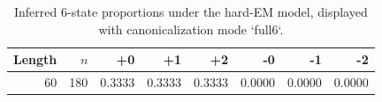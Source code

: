 \begin{table}[t]
\centering
\begin{tabular}{r r r r r r r r}
\hline
Length & $n$ & +0 & +1 & +2 & -0 & -1 & -2 \\
\hline
60 & 180 & 0.3333 & 0.3333 & 0.3333 & 0.0000 & 0.0000 & 0.0000 \\
\hline
\end{tabular}
\caption{Inferred 6-state proportions under the hard-EM model, displayed with canonicalization mode `full6`.}
\label{tab:state6_mle}
\end{table}
